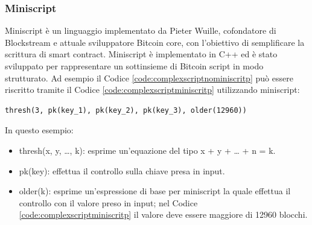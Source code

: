 \subsubsection{Miniscript}

Miniscript è un linguaggio implementato da Pieter Wuille, cofondatore di Blockstream e attuale sviluppatore Bitcoin core, con l'obiettivo di semplificare la scrittura di smart contract.
Miniscript è implementato in C++ ed è stato sviluppato per rappresentare un sottinsieme di Bitcoin script in modo strutturato. Ad esempio il Codice \ref{code:complexscriptnominiscritp} può essere riscritto tramite il Codice \ref{code:complexscriptminiscritp} utilizzando miniscript:

\begin{lstlisting}[language=miniscript, label={code:complexscriptminiscritp}, caption={Un esempio di utilizzo di miniscript.}]
thresh(3, pk(key_1), pk(key_2), pk(key_3), older(12960))
\end{lstlisting}

In questo esempio:
\begin{itemize}
  \item thresh(x, y, …, k): esprime un'equazione del tipo x + y + … + n = k.
  \item pk(key): effettua il controllo sulla chiave presa in input.
  \item older(k): esprime un'espressione di base per miniscript la quale effettua il controllo con il valore preso in input; nel Codice \ref{code:complexscriptminiscritp} il valore deve essere maggiore di 12960 blocchi.
\end{itemize}
